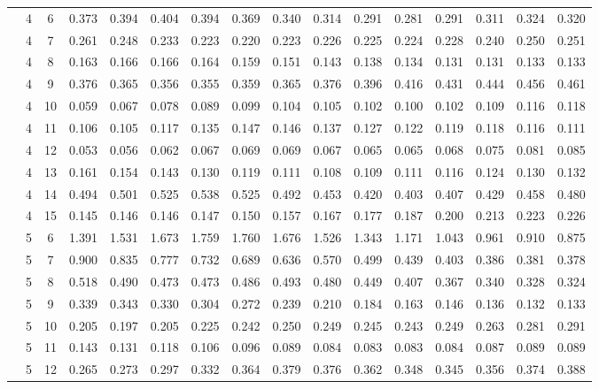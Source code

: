 \documentclass[useAMS,usenatbib]{mn2e}
\begin{document}
\begin{longtable}{cccccccccccccccc}
 &  4 &  6 & 0.373 & 0.394 & 0.404 & 0.394 & 0.369 & 0.340 & 0.314 & 0.291 & 0.281 & 0.291 & 0.311 & 0.324 & 0.320 \\
 &  4 &  7 & 0.261 & 0.248 & 0.233 & 0.223 & 0.220 & 0.223 & 0.226 & 0.225 & 0.224 & 0.228 & 0.240 & 0.250 & 0.251 \\
 &  4 &  8 & 0.163 & 0.166 & 0.166 & 0.164 & 0.159 & 0.151 & 0.143 & 0.138 & 0.134 & 0.131 & 0.131 & 0.133 & 0.133 \\
 &  4 &  9 & 0.376 & 0.365 & 0.356 & 0.355 & 0.359 & 0.365 & 0.376 & 0.396 & 0.416 & 0.431 & 0.444 & 0.456 & 0.461 \\
 &  4 & 10 & 0.059 & 0.067 & 0.078 & 0.089 & 0.099 & 0.104 & 0.105 & 0.102 & 0.100 & 0.102 & 0.109 & 0.116 & 0.118 \\
 &  4 & 11 & 0.106 & 0.105 & 0.117 & 0.135 & 0.147 & 0.146 & 0.137 & 0.127 & 0.122 & 0.119 & 0.118 & 0.116 & 0.111 \\
 &  4 & 12 & 0.053 & 0.056 & 0.062 & 0.067 & 0.069 & 0.069 & 0.067 & 0.065 & 0.065 & 0.068 & 0.075 & 0.081 & 0.085 \\
 &  4 & 13 & 0.161 & 0.154 & 0.143 & 0.130 & 0.119 & 0.111 & 0.108 & 0.109 & 0.111 & 0.116 & 0.124 & 0.130 & 0.132 \\
 &  4 & 14 & 0.494 & 0.501 & 0.525 & 0.538 & 0.525 & 0.492 & 0.453 & 0.420 & 0.403 & 0.407 & 0.429 & 0.458 & 0.480 \\
 &  4 & 15 & 0.145 & 0.146 & 0.146 & 0.147 & 0.150 & 0.157 & 0.167 & 0.177 & 0.187 & 0.200 & 0.213 & 0.223 & 0.226 \\
 &  5 &  6 & 1.391 & 1.531 & 1.673 & 1.759 & 1.760 & 1.676 & 1.526 & 1.343 & 1.171 & 1.043 & 0.961 & 0.910 & 0.875 \\
 &  5 &  7 & 0.900 & 0.835 & 0.777 & 0.732 & 0.689 & 0.636 & 0.570 & 0.499 & 0.439 & 0.403 & 0.386 & 0.381 & 0.378 \\
 &  5 &  8 & 0.518 & 0.490 & 0.473 & 0.473 & 0.486 & 0.493 & 0.480 & 0.449 & 0.407 & 0.367 & 0.340 & 0.328 & 0.324 \\
 &  5 &  9 & 0.339 & 0.343 & 0.330 & 0.304 & 0.272 & 0.239 & 0.210 & 0.184 & 0.163 & 0.146 & 0.136 & 0.132 & 0.133 \\
 &  5 & 10 & 0.205 & 0.197 & 0.205 & 0.225 & 0.242 & 0.250 & 0.249 & 0.245 & 0.243 & 0.249 & 0.263 & 0.281 & 0.291 \\
 &  5 & 11 & 0.143 & 0.131 & 0.118 & 0.106 & 0.096 & 0.089 & 0.084 & 0.083 & 0.083 & 0.084 & 0.087 & 0.089 & 0.089 \\
 &  5 & 12 & 0.265 & 0.273 & 0.297 & 0.332 & 0.364 & 0.379 & 0.376 & 0.362 & 0.348 & 0.345 & 0.356 & 0.374 & 0.388 \\

\end{longtable}
\end{document}
